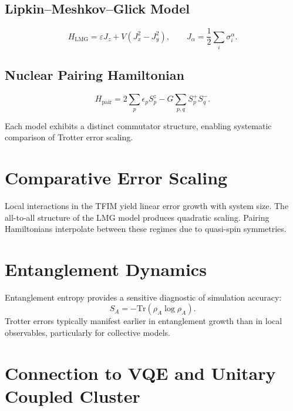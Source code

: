 \documentclass[
  aps,
  prxquantum,
  reprint,
  superscriptaddress,
  nofootinbib
]{revtex4-2}
\begin{document}
\subsection{Lipkin--Meshkov--Glick Model}

\begin{equation}
H_{\text{LMG}} = \varepsilon J_z + V(J_x^2 - J_y^2),
\qquad
J_\alpha = \frac{1}{2}\sum_i \sigma_i^\alpha.
\end{equation}

\subsection{Nuclear Pairing Hamiltonian}

\begin{equation}
H_{\text{pair}} = 2\sum_p \epsilon_p S_p^z
- G\sum_{p,q} S_p^+ S_q^-.
\end{equation}

Each model exhibits a distinct commutator structure, enabling systematic
comparison of Trotter error scaling.

\section{Comparative Error Scaling}

Local interactions in the TFIM yield linear error growth with system size.
The all-to-all structure of the LMG model produces quadratic scaling.
Pairing Hamiltonians interpolate between these regimes due to quasi-spin
symmetries.

\section{Entanglement Dynamics}

Entanglement entropy provides a sensitive diagnostic of simulation accuracy:
\begin{equation}
S_A = -\mathrm{Tr}(\rho_A\log\rho_A).
\end{equation}
Trotter errors typically manifest earlier in entanglement growth than in local
observables, particularly for collective models.

\section{Connection to VQE and Unitary Coupled Cluster}
\end{document}
